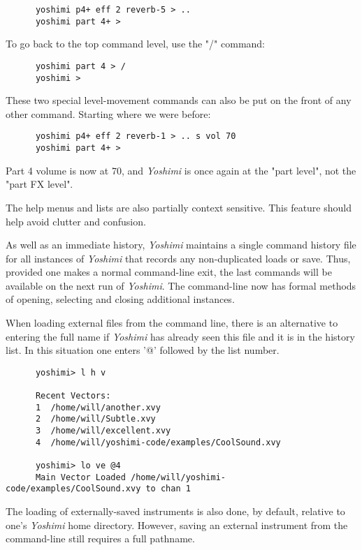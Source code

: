    \begin{verbatim}
      yoshimi p4+ eff 2 reverb-5 > ..
      yoshimi part 4+ >
   \end{verbatim}

   To go back to the top command level, use the "/" command:

   \begin{verbatim}
      yoshimi part 4 > /
      yoshimi >
   \end{verbatim}

   These two special level-movement commands can also be put on the front of
   any other command.  Starting where we were before:

   \begin{verbatim}
      yoshimi p4+ eff 2 reverb-1 > .. s vol 70
      yoshimi part 4+ >
   \end{verbatim}

   Part 4 volume is now at 70, and \textsl{Yoshimi} is once again at the
   "part level", not the "part FX level".

   The help menus and lists are also partially context sensitive. This
   feature should help avoid clutter and confusion.

   As well as an immediate history, \textsl{Yoshimi} maintains a single command
   history file for all instances of \textsl{Yoshimi} that records any
   non-duplicated loads or save.  Thus, provided one makes a normal
   command-line exit, the last commands will be available on the next run of
   \textsl{Yoshimi}.
   The command-line now has formal methods of opening, selecting and closing
   additional instances.

   When loading external files from the command line, there is an alternative
   to entering the full name if \textsl{Yoshimi} has already seen this file and
   it is in the history list. In this situation one enters '@' followed by the
   list number.

   \begin{verbatim}
      yoshimi> l h v

      Recent Vectors:
      1  /home/will/another.xvy
      2  /home/will/Subtle.xvy
      3  /home/will/excellent.xvy
      4  /home/will/yoshimi-code/examples/CoolSound.xvy

      yoshimi> lo ve @4
      Main Vector Loaded /home/will/yoshimi-code/examples/CoolSound.xvy to chan 1
   \end{verbatim}

   The loading of externally-saved instruments is also done, by default,
   relative to one's \textsl{Yoshimi} home directory.  However, saving an
   external instrument from the command-line still requires a full pathname.

